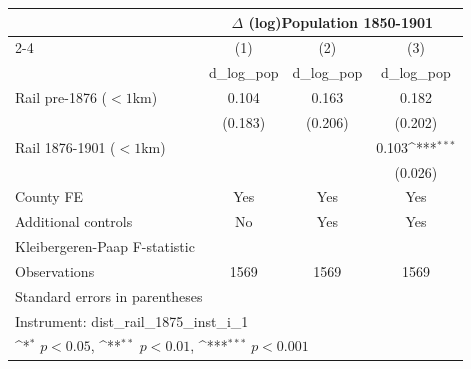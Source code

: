 {
\def\sym#1{\ifmmode^{#1}\else\(^{#1}\)\fi}
\begin{tabular}{l*{3}{c}}
\toprule
                &\multicolumn{3}{c}{$\Delta$ (log)Population 1850-1901}  \\\cmidrule(lr){2-4}
                &\multicolumn{1}{c}{(1)}&\multicolumn{1}{c}{(2)}&\multicolumn{1}{c}{(3)}\\
                &\multicolumn{1}{c}{d\_log\_pop}&\multicolumn{1}{c}{d\_log\_pop}&\multicolumn{1}{c}{d\_log\_pop}\\
\midrule
Rail pre-1876 ($<1$km)&    0.104         &    0.163         &    0.182         \\
                &  (0.183)         &  (0.206)         &  (0.202)         \\
Rail 1876-1901 ($<1$km)&                  &                  &    0.103\sym{***}\\
                &                  &                  &  (0.026)         \\
County FE       &      Yes         &      Yes         &      Yes         \\
Additional controls &       No         &      Yes         &      Yes         \\
\midrule
Kleibergeren-Paap F-statistic&                  &                  &                  \\
Observations    &     1569         &     1569         &     1569         \\
\bottomrule
\multicolumn{4}{l}{\footnotesize Standard errors in parentheses}\\
\multicolumn{4}{l}{\footnotesize Instrument: dist\_rail\_1875\_inst\_i\_1}\\
\multicolumn{4}{l}{\footnotesize \sym{*} \(p<0.05\), \sym{**} \(p<0.01\), \sym{***} \(p<0.001\)}\\
\end{tabular}
}
